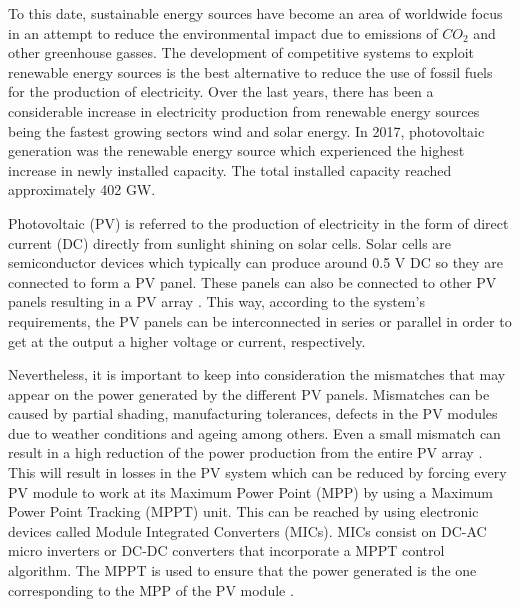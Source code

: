 To this date, sustainable energy sources have become an area of worldwide focus in an attempt to reduce the environmental impact due to emissions of $CO_{2}$ and other greenhouse gasses. The development of competitive systems to exploit renewable energy sources is the best alternative to reduce the use of fossil fuels for the production of electricity. Over the last years, there has been a considerable increase in electricity production from renewable energy sources being the fastest growing sectors wind and solar energy. In 2017, photovoltaic generation was the renewable energy source which experienced the highest increase in newly installed capacity. The total installed capacity reached approximately 402 GW\cite{global}. 

Photovoltaic (PV) is referred to the production of electricity in the form of direct current (DC) directly from sunlight shining on solar cells. Solar cells are semiconductor devices which typically can produce around 0.5 V DC so they are connected to form a PV panel. These panels can also be connected to other PV panels resulting in a PV array \cite{handbook}. This way, according to the system's requirements, the PV panels can be interconnected in series or parallel in order to get at the output a higher voltage or current, respectively.

Nevertheless, it is important to keep into consideration the mismatches that may appear on the power generated by the different PV panels.  Mismatches can be caused by partial shading, manufacturing tolerances, defects in the PV modules due to weather conditions and ageing among others. Even a small mismatch can result in a high reduction of the power production from the entire PV array \cite{MPPmismatch}. This will result in losses in the PV system which can be reduced by forcing every PV module to work at its Maximum Power Point (MPP) by using a Maximum Power Point Tracking (MPPT) unit. This can be reached by using electronic devices called Module Integrated Converters (MICs). MICs consist on DC-AC micro inverters or DC-DC converters that incorporate a MPPT control algorithm. The MPPT is used to ensure that the power generated is the one corresponding to the MPP of the PV module \cite{MPPmismatch}.
